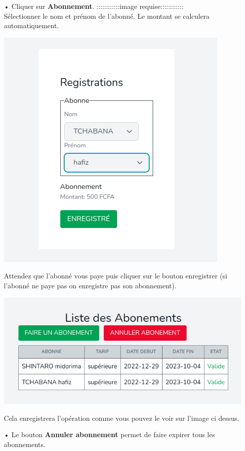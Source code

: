 \documentclass[12pt,a4paper]{article}
\begin{document}
\begin{itemize}
\item[•]  Cliquer sur \textbf{Abonnement}.
::::::::::::image requise::::::::::::\\
Sélectionner le nom et prénom de l'abonné. Le montant se calculera automatiquement.
\begin{center}
\includegraphics[scale=0.56]{img/abonnement_create.png}
\end{center}
Attendez que l'abonné vous paye puis cliquer sur le bouton enregistrer (si l'abonné ne paye pas on enregistre
pas son abonnement).\\
\begin{center}
\includegraphics[scale=0.56]{img/abonnements1.png}
\end{center}
Cela enregistrera l'opération comme vous pouvez le voir sur l'image ci dessus.
\item[•] Le bouton \textbf{Annuler abonnement} permet de faire expirer tous les abonnements.

\end{itemize}
\end{document}
